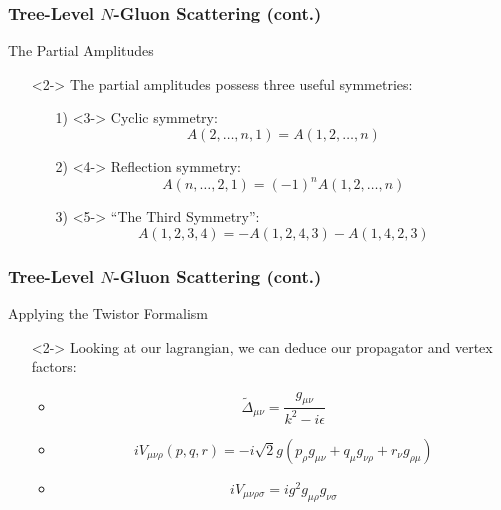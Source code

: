 \documentclass{beamer}
\begin{document}
\begin{frame}
    \frametitle{Tree-Level $N$-Gluon Scattering (cont.)}
    \alert{The Partial Amplitudes}
    \begin{itemize}
        \item[\textbullet]<2-> The partial amplitudes possess three useful symmetries:
        \begin{itemize}
            \item[1)]<3-> Cyclic symmetry: \[A(2,\ldots,n,1) = A(1,2,\ldots,n) \]
            \item[2)]<4-> Reflection symmetry: \[ A(n,\ldots,2,1) = (-1)^nA(1,2,\ldots,n) \]
            \item[3)]<5-> ``The Third Symmetry'': \[ A(1,2,3,4) = -A(1,2,4,3) - A(1,4,2,3) \]
        \end{itemize}
    \end{itemize}
\end{frame}

\begin{frame}
    \frametitle{Tree-Level $N$-Gluon Scattering (cont.)}
    \alert{Applying the Twistor Formalism}
    \begin{itemize}
        \item[\textbullet]<2-> Looking at our lagrangian, we can deduce our propagator and vertex factors:
        \begin{itemize}
            \item<3-> \[ \tilde{\Delta}_{\mu\nu} = \frac{g_{\mu\nu}}{k^2 - i\epsilon} \]
            \item<4-> \[ iV_{\mu\nu\rho}(p,q,r) = -i\sqrt{2}g(p_\rho g_{\mu\nu} + q_\mu g_{\nu\rho} + r_\nu g_{\rho\mu}) \]
            \item<5-> \[ iV_{\mu\nu\rho\sigma} = ig^2 g_{\mu\rho}g_{\nu\sigma} \]   
        \end{itemize}
    \end{itemize}
\end{frame}
\end{document}
